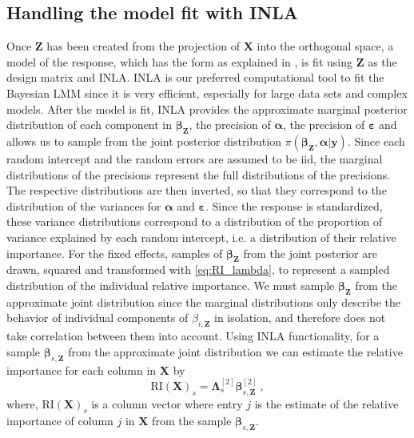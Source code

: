 \subsection{Handling the model fit with INLA}
\label{sec:BVI_handling}
Once $\mathbf{Z}$ has been created from the projection of $\mathbf{X}$ into the orthogonal space, a model of the response, which has the form as explained in , is fit using $\mathbf{Z}$ as the design matrix and INLA. 
INLA is our preferred computational tool to fit the Bayesian LMM since it is very efficient, especially for large data sets and complex models.
After the model is fit, INLA provides the approximate marginal posterior distribution of each component in $\boldsymbol{\beta}_{\mathbf{Z}}$, the precision of $\boldsymbol{\alpha}$, the precision of $\boldsymbol{\varepsilon}$ and allows us to sample from the joint posterior distribution $\pi(\boldsymbol{\beta}_{\mathbf{Z}}, \boldsymbol{\alpha} \lvert \mathbf{y})$. 
Since each random intercept and the random errors are assumed to be iid, the marginal distributions of the precisions represent the full distributions of the precisions. 
The respective distributions are then inverted, so that they correspond to the distribution of the variances for $\boldsymbol{\alpha}$ and $\boldsymbol{\varepsilon}$. 
Since the response is standardized, these variance distributions correspond to a distribution of the proportion of variance explained by each random intercept, i.e. a distribution of their relative importance.
For the fixed effects, samples of $\boldsymbol{\beta}_{\mathbf{Z}}$ from the joint posterior are drawn, squared and transformed with \eqref{eq:RI_lambda}, to represent a sampled distribution of the individual relative importance. 
We must sample $\boldsymbol{\beta}_{\mathbf{Z}}$ from the approximate joint distribution since the marginal distributions only describe the behavior of individual components of $\beta_{i, \mathbf{Z}}$ in isolation, and therefore does not take correlation between them into account.
Using INLA functionality, for a sample $\boldsymbol{\beta}_{s, \mathbf{Z}}$ from the approximate joint distribution we can estimate the relative importance for each column in $\mathbf{X}$ by
\begin{equation}
    \text{RI}(\mathbf{X})_s = \boldsymbol{\Lambda}_{s}^{[2]} \boldsymbol{\beta}_{s, \mathbf{Z}}^{[2]} \ ,
\end{equation}
where, $\text{RI}(\mathbf{X})_s$ is a column vector where entry $j$ is the estimate of the relative importance of column $j$ in $\mathbf{X}$ from the sample $\boldsymbol{\beta}_{s, \mathbf{Z}}$.

